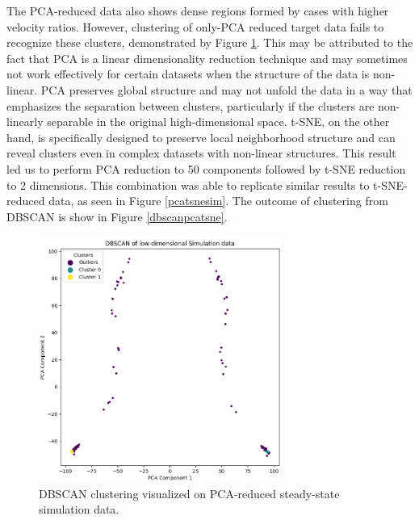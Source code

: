 The PCA-reduced data also shows dense regions formed by cases with higher velocity ratios. However, clustering of only-PCA reduced target data fails to recognize these clusters, demonstrated by Figure \ref{dbscanpca}. This may be attributed to the fact that PCA is a linear dimensionality reduction technique and may sometimes not work effectively for certain datasets when the structure of the data is non-linear. PCA preserves global structure and may not unfold the data in a way that emphasizes the separation between clusters, particularly if the clusters are non-linearly separable in the original high-dimensional space. t-SNE, on the other hand, is specifically designed to preserve local neighborhood structure and can reveal clusters even in complex datasets with non-linear structures. This result led us to perform PCA reduction to 50 components followed by t-SNE reduction to 2 dimensions. This combination was able to replicate similar results to t-SNE-reduced data, as seen in Figure \ref{pcatsnesim}. The outcome of clustering from DBSCAN is show in Figure \ref{dbscanpcatsne}. \\
\begin{figure}[ht]
    \centering
    \includegraphics[width=8cm]{images/Clustering/dbscan_pca_sim.png}
    \caption{DBSCAN clustering visualized on PCA-reduced steady-state simulation data.}
    \label{dbscanpca}
    \end{figure}
